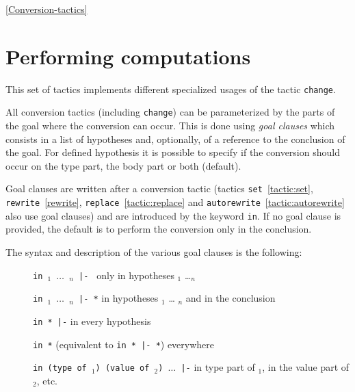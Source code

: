 \begin{coq_example*}

\SeeAlso \ref{Conversion-tactics}


\section{Performing computations
\label{Conversion-tactics}}

This set of tactics implements different specialized usages of the
tactic \texttt{change}.

All conversion tactics (including \texttt{change}) can be
parameterized by the parts of the goal where the conversion can
occur. This is done using \emph{goal clauses} which consists in a list
of hypotheses and, optionally, of a reference to the conclusion of the
goal. For defined hypothesis it is possible to specify if the
conversion should occur on the type part, the body part or both
(default).

Goal clauses are written after a conversion tactic (tactics
\texttt{set}~\ref{tactic:set},          \texttt{rewrite}~\ref{rewrite},
\texttt{replace}~\ref{tactic:replace}                               and
\texttt{autorewrite}~\ref{tactic:autorewrite} also use goal clauses)  and
are introduced by  the keyword \texttt{in}. If no goal clause is provided,
the default is to perform the conversion only in the conclusion.

The syntax and description of the various goal clauses is the following:
\begin{description}
\item[]\texttt{in {\ident}$_1$ $\ldots$ {\ident}$_n$ |- } only in hypotheses {\ident}$_1$
  \ldots {\ident}$_n$
\item[]\texttt{in {\ident}$_1$ $\ldots$ {\ident}$_n$ |- *} in hypotheses {\ident}$_1$ \ldots
  {\ident}$_n$ and in the conclusion
\item[]\texttt{in * |-} in every hypothesis
\item[]\texttt{in *} (equivalent to \texttt{in * |- *}) everywhere
\item[]\texttt{in (type of {\ident}$_1$) (value of {\ident}$_2$) $\ldots$ |-} in
  type part of {\ident}$_1$, in the value part of {\ident}$_2$, etc.
\end{description}


\end{coq_example*}
